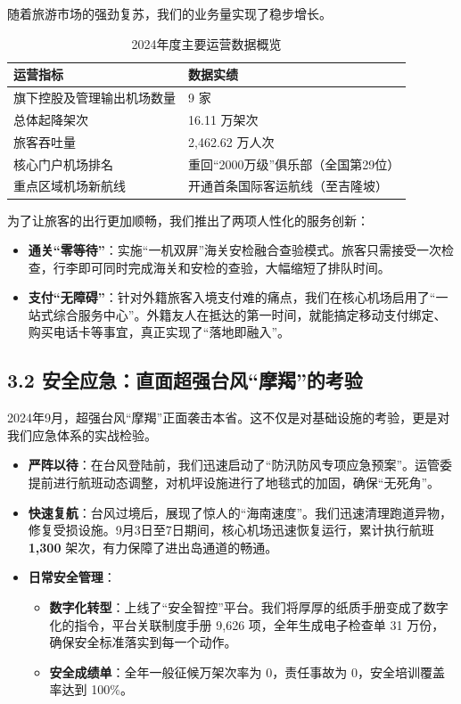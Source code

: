 \documentclass[a4paper,12pt]{article}
\begin{document}
随着旅游市场的强劲复苏，我们的业务量实现了稳步增长。

\begin{table}[h]
    \centering
    \caption{2024年度主要运营数据概览}
    \label{tab:ops_data}
    \renewcommand{\arraystretch}{1.3}
    \begin{tabular}{p{8cm} p{4cm}}
        \toprule
        \textbf{运营指标} & \textbf{数据实绩} \\
        \midrule
        旗下控股及管理输出机场数量 & 9 家 \\
        总体起降架次 & 16.11 万架次 \\
        旅客吞吐量 & 2,462.62 万人次 \\
        核心门户机场排名 & 重回“2000万级”俱乐部（全国第29位） \\
        重点区域机场新航线 & 开通首条国际客运航线（至吉隆坡） \\
        \bottomrule
    \end{tabular}
\end{table}

为了让旅客的出行更加顺畅，我们推出了两项人性化的服务创新：

\begin{itemize}
    \item \textbf{通关“零等待”}：实施“一机双屏”海关安检融合查验模式。旅客只需接受一次检查，行李即可同时完成海关和安检的查验，大幅缩短了排队时间。
    \item \textbf{支付“无障碍”}：针对外籍旅客入境支付难的痛点，我们在核心机场启用了“一站式综合服务中心”。外籍友人在抵达的第一时间，就能搞定移动支付绑定、购买电话卡等事宜，真正实现了“落地即融入”。
\end{itemize}

\subsection{3.2 安全应急：直面超强台风“摩羯”的考验}

2024年9月，超强台风“摩羯”正面袭击本省。这不仅是对基础设施的考验，更是对我们应急体系的实战检验。

\begin{itemize}
    \item \textbf{严阵以待}：在台风登陆前，我们迅速启动了“防汛防风专项应急预案”。运管委提前进行航班动态调整，对机坪设施进行了地毯式的加固，确保“无死角”。
    \item \textbf{快速复航}：台风过境后，展现了惊人的“海南速度”。我们迅速清理跑道异物，修复受损设施。9月3日至7日期间，核心机场迅速恢复运行，累计执行航班 \textbf{1,300} 架次，有力保障了进出岛通道的畅通。
    \item \textbf{日常安全管理}：
    \begin{itemize}
        \item \textbf{数字化转型}：上线了“安全智控”平台。我们将厚厚的纸质手册变成了数字化的指令，平台关联制度手册 9,626 项，全年生成电子检查单 31 万份，确保安全标准落实到每一个动作。
        \item \textbf{安全成绩单}：全年一般征候万架次率为 0，责任事故为 0，安全培训覆盖率达到 100\%。
    \end{itemize}
\end{itemize}
\end{document}
